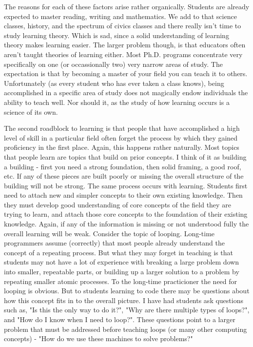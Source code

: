\documentclass[11pt,fleqn]{book} %
\begin{document}
The reasons for each of these factors arise rather organically.  Students are already expected to master reading, writing and mathematics.  We add to that science classes, history, and the spectrum of civics classes and there really isn't time to study learning theory.  Which is sad, since a solid understanding of learning theory makes learning easier.  The larger problem though, is that educators often aren't taught theories of learning either.  Most Ph.D. programs concentrate very specifically on one (or occassionally two) very narrow areas of study.  The expectation is that by becoming a master of your field you can teach it to others.  Unfortunately (as every student who has ever taken a class knows), being accomplished in a specific area of study does not magically endow individuals the ability to teach well.  Nor should it, as the study of how learning occurs is a science of its own.

The second roadblock to learning is that people that have accomplished a high level of skill in a particular field often forget the process by which they gained proficiency in the first place.  Again, this happens rather naturally.  Most topics that people learn are topics that build on prior concepts.  I think of it as building a building - first you need a strong foundation, then solid framing, a good roof, etc.  If any of these pieces are built poorly or missing the overall structure of the building will not be strong.  The same process occurs with learning.  Students first need to attach new and simpler concepts to their own existing knowledge.  Then they must develop good understanding of core concepts of the field they are trying to learn, and attach those core concepts to the foundation of their existing knowledge.  Again, if any of the information is missing or not understood fully the overall learning will be weak.  Consider the topic of looping.  Long-time programmers assume (correctly) that most people already understand the concept of a repeating process.  But what they may forget in teaching is that students may not have a lot of experience with breaking a large problem down into smaller, repeatable parts, or building up a larger solution to a problem by repeating smaller atomic processes.  To the long-time practicioner the need for looping is obvious.  But to students learning to code there may be questions about how this concept fits in to the overall picture.  I have had students ask questions such as, "Is this the only way to do it?", "Why are there multiple types of loops?", and "How do I know when I need to loop?".  These questions point to a larger problem that must be addressed before teaching loops (or many other computing concepts) - "How do we use these machines to solve problems?"
\end{document}
